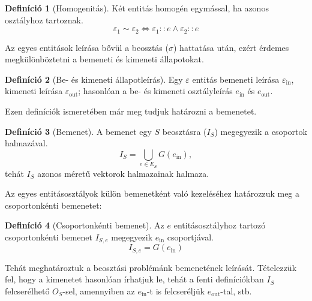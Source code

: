 \documentclass[twocolumn]{article}
\theoremstyle{definition}
\newtheorem{definition}{Definíció}[section]
\newcommand{\subin}[1]{ {#1}_{\text{in}} }
\newcommand{\subout}[1]{ {#1}_{\text{out}} }
\begin{document}
    \begin{definition}[Homogenitás]
        Két entitás homogén egymással, ha azonos osztályhoz tartoznak.
        \begin{equation}
            \varepsilon_1 \sim \varepsilon_2 \Longleftrightarrow \varepsilon_1 :: e \wedge \varepsilon_2 :: e
        \end{equation}
    \end{definition}
    
    Az egyes entitások leírása bővül a beosztás ($\sigma$) hattatása után, ezért érdemes megkülönböztetni a bemeneti és kimeneti állapotokat.
    
    \begin{definition}[Be- és kimeneti állapotleírás]
        Egy $\varepsilon$ entitás bemeneti leírása $\subin{\varepsilon}$, kimeneti leírása $\subout{\varepsilon}$; hasonlóan a be- és kimeneti osztályleírás $\subin{e}$ és $\subout{e}$.
    \end{definition}
    
    Ezen definíciók ismeretében már meg tudjuk határozni a bemenetet.
    
    \begin{definition}[Bemenet]
        A bemenet egy $S$ beosztásra ($I_S$) megegyezik a csoportok halmazával.
        \begin{equation}
            I_S = \bigcup_{e \in E_S} G(\subin{e}),
        \end{equation}
        tehát $I_S$ azonos méretű vektorok halmazainak halmaza.
    \end{definition}
    
    Az egyes entitásosztályok külön bemenetként való kezeléséhez határozzuk meg a csoportonkénti bemenetet:
    
    \begin{definition}[Csoportonkénti bemenet]
        Az $e$ entitásosztályhoz tartozó csoportonkénti bemenet $I_{S, e}$ megegyezik $\subin{e}$ csoportjával.
        \begin{equation}
            I_{S, e} = G(\subin{e})
        \end{equation}
    \end{definition}
    
    Tehát meghatároztuk a beosztási problémánk bemenetének leírását. Tételezzük fel, hogy a kimenetet hasonlóan írhatjuk le, tehát a fenti definíciókban $I_S$ felcserélhető $O_S$-sel, amennyiben az $\subin{e}$-t is felcseréljük $\subout{e}$-tal, stb.
    
\end{document}
